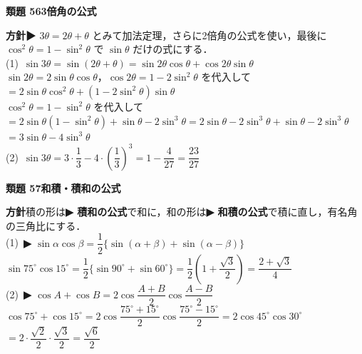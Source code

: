 \documentclass[a4paper,11pt]{ltjsarticle}
\newcommand{\ans}[2]{\Needspace{5\baselineskip}\vspace{6pt}%
  {\sffamily\bfseries 類題 #1\quad #2}\par}
\newcommand{\point}[1]{\textsf{\bfseries ▶ #1}}
\begin{document}
\ans{56}{3倍角の公式}
\begin{kai}
\textbf{方針}\quad \point{$3\theta=2\theta+\theta$} とみて加法定理，さらに2倍角の公式を使い，最後に $\cos^2\theta=1-\sin^2\theta$ で $\sin\theta$ だけの式にする．\\[2pt]
(1)\ $\sin3\theta=\sin(2\theta+\theta)=\sin2\theta\cos\theta+\cos2\theta\sin\theta$\\
\hspace*{1.5em}$\sin2\theta=2\sin\theta\cos\theta$，$\cos2\theta=1-2\sin^2\theta$ を代入して\\
\hspace*{1.5em}$=2\sin\theta\cos^2\theta+(1-2\sin^2\theta)\sin\theta$\\
\hspace*{1.5em}$\cos^2\theta=1-\sin^2\theta$ を代入して\\
\hspace*{1.5em}$=2\sin\theta(1-\sin^2\theta)+\sin\theta-2\sin^3\theta=2\sin\theta-2\sin^3\theta+\sin\theta-2\sin^3\theta$\\
\hspace*{1.5em}$=3\sin\theta-4\sin^3\theta$\\[2pt]
(2)\ $\sin3\theta=3\cdot\dfrac13-4\cdot\left(\dfrac13\right)^3=1-\dfrac4{27}=\dfrac{23}{27}$
\end{kai}

\ans{57}{和積・積和の公式}
\begin{kai}
\textbf{方針}\quad 積の形は\point{積和の公式}で和に，和の形は\point{和積の公式}で積に直し，有名角の三角比にする．\\[2pt]
(1)\ \point{$\sin\alpha\cos\beta=\dfrac12\{\sin(\alpha+\beta)+\sin(\alpha-\beta)\}$}\\
\hspace*{1.5em}$\sin75^\circ\cos15^\circ=\dfrac12\{\sin90^\circ+\sin60^\circ\}=\dfrac12\left(1+\dfrac{\sqrt3}2\right)=\dfrac{2+\sqrt3}{4}$\\[2pt]
(2)\ \point{$\cos A+\cos B=2\cos\dfrac{A+B}2\cos\dfrac{A-B}2$}\\
\hspace*{1.5em}$\cos75^\circ+\cos15^\circ=2\cos\dfrac{75^\circ+15^\circ}2\cos\dfrac{75^\circ-15^\circ}2=2\cos45^\circ\cos30^\circ$\\
\hspace*{1.5em}$=2\cdot\dfrac{\sqrt2}2\cdot\dfrac{\sqrt3}2=\dfrac{\sqrt6}{2}$
\end{kai}
\end{document}
